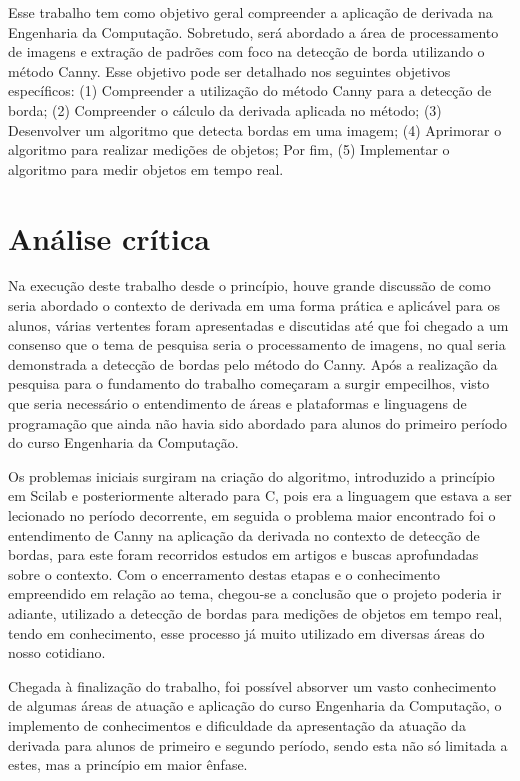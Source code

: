 \documentclass[12pt]{article}
\begin{document}
	Esse trabalho tem como objetivo geral compreender a aplicação de derivada na Engenharia da Computação. Sobretudo, será abordado a área de processamento de imagens e extração de padrões com foco na detecção de borda utilizando o método Canny. Esse objetivo pode ser detalhado nos seguintes objetivos específicos: (1) Compreender a utilização do método Canny para a detecção de borda; (2) Compreender o cálculo da derivada aplicada no método; (3) Desenvolver um algoritmo que detecta bordas em uma imagem;  (4) Aprimorar o algoritmo para realizar medições de objetos; Por fim, (5) Implementar o algoritmo para medir objetos em tempo real.
	
	
	\section{Análise crítica} \label{sec:firstpage}
	
	Na execução deste trabalho desde o princípio, houve grande discussão de como seria abordado o contexto de derivada em uma forma prática e aplicável para os alunos, várias vertentes foram apresentadas e discutidas até que foi chegado a um consenso que o tema de pesquisa seria o processamento de imagens, no qual seria demonstrada a detecção de bordas pelo método do Canny. Após a realização da pesquisa para o fundamento do trabalho começaram a surgir empecilhos, visto que seria necessário o entendimento de áreas e plataformas e linguagens de programação que ainda não havia sido abordado para alunos do primeiro período do curso Engenharia da Computação.
	
	Os problemas iniciais surgiram na criação do algoritmo, introduzido a princípio em Scilab e posteriormente alterado para C, pois era a linguagem que estava a ser lecionado no período decorrente, em seguida o problema maior encontrado foi o entendimento de Canny na aplicação da derivada no contexto de detecção de bordas, para este foram recorridos estudos em artigos e buscas aprofundadas sobre o contexto. Com o encerramento destas etapas e o conhecimento empreendido em relação ao tema, chegou-se a conclusão que o projeto poderia ir adiante, utilizado a detecção de bordas para medições de objetos em tempo real, tendo em conhecimento, esse processo já muito utilizado em diversas áreas do nosso cotidiano. 
	
	Chegada à finalização do trabalho, foi possível absorver um vasto conhecimento de algumas áreas de atuação e aplicação do curso Engenharia da Computação, o implemento de conhecimentos e dificuldade da apresentação da atuação da derivada para alunos de primeiro e segundo período, sendo esta não só limitada a estes, mas a princípio em maior ênfase.
	
\end{document}
